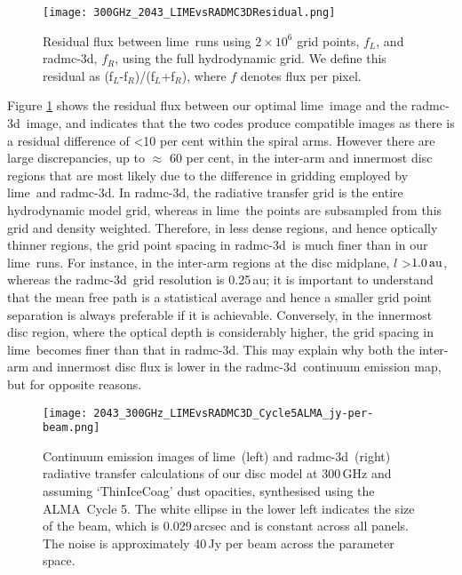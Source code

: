 \documentclass[fleqn,usenatbib]{mnras}
\newcommand{\lime}{{\sc lime}}
\newcommand{\radmc}{{\sc radmc-3d}}
\newcommand{\alma}{ALMA}
\begin{document}
\begin{figure}
    \centering
    \texttt{[image: 300GHz\_2043\_LIMEvsRADMC3DResidual.png]}
    \caption{Residual flux between \lime\ runs using $2 \times 10^6$ grid points, $f_L$, and \radmc, $f_R$, using the full hydrodynamic grid. We define this residual as (f$_L$-f$_R$)/(f$_L$+f$_R$), where $f$ denotes flux per pixel.}
    \label{fig:LIMERADMCResidual}
\end{figure}

Figure \ref{fig:LIMERADMCResidual} shows the residual flux between our optimal \lime\ image and the \radmc\ image, and indicates that the two codes produce compatible images as there is a residual difference of \textless 10 per cent within the spiral arms. However there are large discrepancies, up to $\approx$ 60 per cent, in the inter-arm and innermost disc regions that are most likely due to the difference in gridding employed by \lime\ and \radmc. In \radmc, the radiative transfer grid is the entire hydrodynamic model grid, whereas in \lime\ the points are subsampled from this grid and density weighted. Therefore, in less dense regions, and hence optically thinner regions, the grid point spacing in \radmc\ is much finer than in our \lime\ runs. For instance, in the inter-arm regions at the disc midplane, $l$ \textgreater $1.0\,\rm au$, whereas the \radmc\ grid resolution is 0.25\,au; it is important to understand that the mean free path is a statistical average and hence a smaller grid point separation is always preferable if it is achievable. Conversely, in the innermost disc region, where the optical depth is considerably higher, the grid spacing in \lime\ becomes finer than that in \radmc. This may explain why both the inter-arm and innermost disc flux is lower in the \radmc\ continuum emission map, but for opposite reasons.

\begin{figure}
    \centering
    \texttt{[image: 2043\_300GHz\_LIMEvsRADMC3D\_Cycle5ALMA\_jy-per-beam.png]}
    \caption{Continuum emission images of \lime\ (left) and \radmc\ (right) radiative transfer calculations of our disc model at 300\,GHz and assuming `ThinIceCoag' dust opacities, synthesised using the \alma\ Cycle 5. The white ellipse in the lower left indicates the size of the beam, which is 0.029\,arcsec and is constant across all panels. The noise is approximately 40\,\textmu Jy per beam across the parameter space.}
    \label{fig:LIMERADMCCycle5}
\end{figure}
\end{document}
